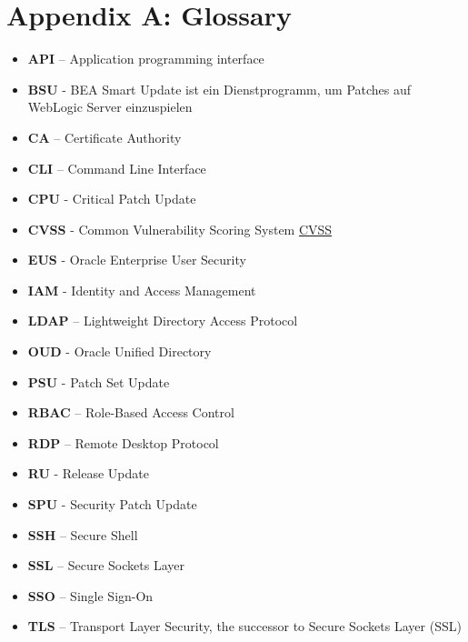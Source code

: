 \hypertarget{appendix-a-glossary}{%
\section{Appendix A: Glossary}\label{appendix-a-glossary}}

\begin{itemize}
\tightlist
\item
  \textbf{API} -- Application programming interface
\item
  \textbf{BSU} - BEA Smart Update ist ein Dienstprogramm, um Patches auf
  WebLogic Server einzuspielen
\item
  \textbf{CA} -- Certificate Authority
\item
  \textbf{CLI} -- Command Line Interface
\item
  \textbf{CPU} - Critical Patch Update
\item
  \textbf{CVSS} - Common Vulnerability Scoring System
  \href{http://www.first.org/cvss}{CVSS}
\item
  \textbf{EUS} - Oracle Enterprise User Security
\item
  \textbf{IAM} - Identity and Access Management
\item
  \textbf{LDAP} -- Lightweight Directory Access Protocol
\item
  \textbf{OUD} - Oracle Unified Directory
\item
  \textbf{PSU} - Patch Set Update
\item
  \textbf{RBAC} -- Role-Based Access Control
\item
  \textbf{RDP} -- Remote Desktop Protocol
\item
  \textbf{RU} - Release Update
\item
  \textbf{SPU} - Security Patch Update
\item
  \textbf{SSH} -- Secure Shell
\item
  \textbf{SSL} -- Secure Sockets Layer
\item
  \textbf{SSO} -- Single Sign-On
\item
  \textbf{TLS} -- Transport Layer Security, the successor to Secure
  Sockets Layer (SSL)
\end{itemize}
